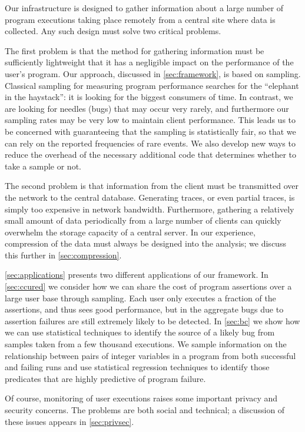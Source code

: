 Our infrastructure is designed to gather information about a large
number of program executions taking place remotely from a central site
where data is collected.  Any such design must solve two critical
problems.

The first problem is that the method for gathering information must be
sufficiently lightweight that it has a negligible impact on the
performance of the user's program.  Our approach, discussed in
\autoref{sec:framework}, is based on sampling.  Classical sampling for
measuring program performance searches for the ``elephant in the
haystack'': it is looking for the biggest consumers of time.  In
contrast, we are looking for needles (bugs) that may occur very
rarely, and furthermore our sampling rates may be very low to maintain
client performance.  This leads us to be concerned with guaranteeing
that the sampling is statistically fair, so that we can rely on the
reported frequencies of rare events.  We also develop new ways to
reduce the overhead of the necessary additional code that determines
whether to take a sample or not.

The second problem is that information from the client must be
transmitted over the network to the central database.  Generating
traces, or even partial traces, is simply too expensive in network
bandwidth.  Furthermore, gathering a relatively small amount of data
periodically from a large number of clients can quickly overwhelm the
storage capacity of a central server.  In our experience, compression
of the data must always be designed into the analysis; we discuss this
further in \autoref{sec:compression}.


\autoref{sec:applications} presents two different applications of our
framework.  In \autoref{sec:ccured} we consider how we can share the
cost of program assertions over a large user base through sampling.
Each user only executes a fraction of the assertions, and thus sees
good performance, but in the aggregate bugs due to assertion failures
are still extremely likely to be detected.    In
\autoref{sec:bc} we show how we can use statistical techniques to
identify the source of a likely bug from samples taken from a few
thousand executions.  We sample information on the relationship
between pairs of integer variables in a program from both successful
and failing runs and use statistical regression techniques to identify
those predicates that are highly predictive of program failure.

Of course, monitoring of user executions raises some important privacy
and security concerns.  The problems are both social and technical; a
discussion of these issues appears in \autoref{sec:privsec}.

